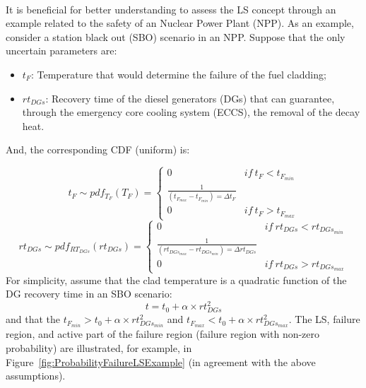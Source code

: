 \\It is beneficial for better understanding to assess the LS concept through an example related to the safety of an Nuclear Power Plant (NPP).
As an example, consider a station black out (SBO) scenario in an NPP. Suppose that the only uncertain parameters are:
\begin{itemize}
  \item $t_{F}$: Temperature that would determine the failure of the fuel cladding;
  \item $rt_{DGs}$: Recovery time of the diesel generators (DGs) that 
  can guarantee, through the emergency core cooling system (ECCS), 
  the removal of the decay heat.
\end{itemize}
And, the corresponding CDF (uniform) is:

\begin{equation}
t_{F}\sim pdf_{T_{F}}\left ( T_{F} \right )=\left\{\begin{matrix}
0 & if \: t_{F}< t_{F_{min}} \\ 
\frac{1}{\left ( t_{F_{max}}- t_{F_{min}} \right )=\Delta t_{F}} & \\ 
0 & if \: t_{F}>  t_{F_{max}} 
\end{matrix}\right.
\end{equation}
%
%
\begin{equation}
rt_{DGs}\sim pdf_{RT_{DGs}}\left ( rt_{DGs} \right )=\left\{\begin{matrix}
0 & if \: rt_{DGs}<rt_{DGs_{min}}   \\ 
\frac{1}{\left ( rt_{DGs_{max}} - rt_{DGs_{min}} \right )=\Delta rt_{DGs}} & \\ 
0 & if \: rt_{DGs}>rt_{DGs_{max}} 
\end{matrix}\right.
\end{equation}
For simplicity, assume that the clad temperature is a quadratic function of the DG recovery time in an SBO scenario:
\begin{equation}
  t = t_{0}+\alpha \times rt_{DGs}^{2}
\end{equation}
and that the  $ t_{F_{min}} > t_{0}+\alpha \times rt_{DGs_{min}}^{2}$
and $t_{F_{max}} < t_{0}+\alpha \times rt_{DGs_{max}}^{2}$.
The LS, failure region, and active part of the failure region (failure region with non-zero probability) are illustrated, for example, in Figure~\ref{fig:ProbabilityFailureLSExample} (in agreement with the above assumptions).
